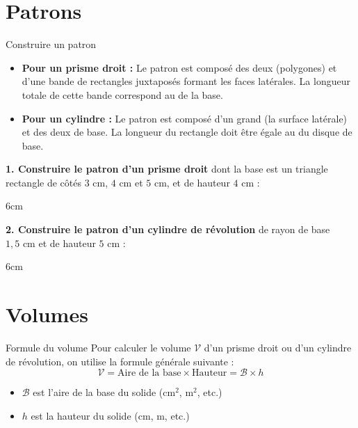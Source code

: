 \documentclass[a4paper]{book}
\begin{document}
\section{Patrons}

    \begin{methodeTitre}{Construire un patron}
        \begin{itemize}
            \item \textbf{Pour un prisme droit :} Le patron est composé des deux \points[5] (polygones) et d'une bande de rectangles juxtaposés formant les faces latérales. La longueur totale de cette bande correspond au \points[6] de la base.
            \item \textbf{Pour un cylindre :} Le patron est composé d'un grand \points[7] (la surface latérale) et des deux \points[5] de base. La longueur du rectangle doit être égale au \points[8] du disque de base.
        \end{itemize}
    \end{methodeTitre}

    \begin{exemple}
        \textbf{1. Construire le patron d'un prisme droit} dont la base est un triangle rectangle de côtés $3\text{ cm}$, $4\text{ cm}$ et $5\text{ cm}$, et de hauteur $4\text{ cm}$ :
    \end{exemple}
    \begin{ZoneReponse}{6cm}
    \end{ZoneReponse}

    \begin{exemple}
        \textbf{2. Construire le patron d'un cylindre de révolution} de rayon de base $1,5\text{ cm}$ et de hauteur $5\text{ cm}$ :
    \end{exemple}
    \begin{ZoneReponse}{6cm}
    \end{ZoneReponse}

\section{Volumes}

    \begin{proprieteTitre}{Formule du volume}
        Pour calculer le volume $\mathcal{V}$ d'un prisme droit ou d'un cylindre de révolution, on utilise la formule générale suivante :
        \[ \mathcal{V} = \text{Aire de la base} \times \text{Hauteur} = \mathcal{B} \times h \]
        \begin{itemize}
            \item $\mathcal{B}$ est l'aire de la base du solide ($\text{cm}^2$, $\text{m}^2$, etc.)
            \item $h$ est la hauteur du solide ($\text{cm}$, $\text{m}$, etc.)
        \end{itemize}
    \end{proprieteTitre}
\end{document}
